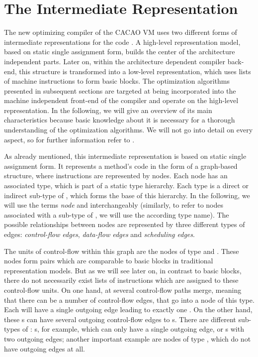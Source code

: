 \section{The Intermediate Representation}
\label{sec:intermediate-representation}

The new optimizing compiler of the CACAO VM uses two different forms of intermediate representations for the code \cite{eisl:2013}. A high-level representation model, based on static single assignment form, builds the center of the architecture independent parts. Later on, within the architecture dependent compiler back-end, this structure is transformed into a low-level representation, which uses lists of machine instructions to form basic blocks. The optimization algorithms presented in subsequent sections are targeted at being incorporated into the machine independent front-end of the compiler and operate on the high-level representation. In the following, we will give an overview of its main characteristics because basic knowledge about it is necessary for a thorough understanding of the optimization algorithms. We will not go into detail on every aspect, so for further information refer to \cite{eisl:2013}.

As already mentioned, this intermediate representation is based on static single assignment form. It represents a method's code in the form of a graph-based structure, where instructions are represented by nodes. Each node has an associated type, which is part of a static type hierarchy. Each type is a direct or indirect sub-type of , which forms the base of this hierarchy. In the following, we will use the terms \emph{node} and  interchangeably (similarly, to refer to nodes associated with a sub-type of , we will use the according type name). The possible relationships between nodes are represented by three different types of edges: \emph{control-flow edges}, \emph{data-flow edges} and \emph{scheduling edges}.

The units of control-flow within this graph are the nodes of type  and . These nodes form pairs which are comparable to basic blocks in traditional representation models. But as we will see later on, in contrast to basic blocks, there do not necessarily exist lists of instructions which are assigned to these control-flow units. On one hand, at  several control-flow paths merge, meaning that there can be a number of control-flow edges, that go into a node of this type. Each  will have a single outgoing edge leading to exactly one . On the other hand, these s can have several outgoing control-flow edges to s. There are different sub-types of : s, for example, which can only have a single outgoing edge, or s with two outgoing edges; another important example are nodes of type , which do not have outgoing edges at all.

